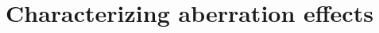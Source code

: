 \documentclass[12pt]{iopart}
\begin{document}











\section{Characterizing aberration effects}
\end{document}
